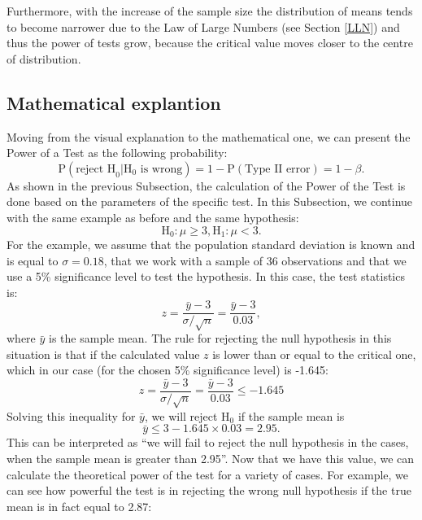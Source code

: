 \documentclass[
]{book}
\theoremstyle{definition}
\theoremstyle{definition}
\theoremstyle{definition}
\theoremstyle{definition}
\theoremstyle{remark}
\begin{document}
Furthermore, with the increase of the sample size the distribution of means tends to become narrower due to the Law of Large Numbers (see Section \ref{LLN}) and thus the power of tests grow, because the critical value moves closer to the centre of distribution.

\subsection{Mathematical explantion}\label{PowerMathematical}

Moving from the visual explanation to the mathematical one, we can present the Power of a Test as the following probability:
\begin{equation}
    \mathrm{P}(\text{reject H}_0 | \mathrm{H}_0 \text{ is wrong}) = 1 - \mathrm{P}(\text{Type II error}) = 1-\beta.
    \label{eq:powerOfATestConcept}
\end{equation}
As shown in the previous Subsection, the calculation of the Power of the Test is done based on the parameters of the specific test. In this Subsection, we continue with the same example as before and the same hypothesis:
\begin{equation*}
    \mathrm{H}_0: \mu \geq 3, \mathrm{H}_1: \mu < 3.
\end{equation*}
For the example, we assume that the population standard deviation is known and is equal to \(\sigma=0.18\), that we work with a sample of 36 observations and that we use a 5\% significance level to test the hypothesis. In this case, the test statistics is:
\begin{equation}
    z = \frac{\bar{y}-3}{\sigma/\sqrt{n}} = \frac{\bar{y}-3}{0.03} ,
    \label{eq:powerOfATest01}
\end{equation}
where \(\bar{y}\) is the sample mean. The rule for rejecting the null hypothesis in this situation is that if the calculated value \(z\) is lower than or equal to the critical one, which in our case (for the chosen 5\% significance level) is -1.645:
\begin{equation*}
    z = \frac{\bar{y}-3}{\sigma/\sqrt{n}} = \frac{\bar{y}-3}{0.03} \leq -1.645
\end{equation*}
Solving this inequality for \(\bar{y}\), we will reject H\(_0\) if the sample mean is
\begin{equation}
    \bar{y} \leq 3 -1.645 \times 0.03 = 2.95 .
    \label{eq:powerOfATest02}
\end{equation}
This can be interpreted as ``we will fail to reject the null hypothesis in the cases, when the sample mean is greater than 2.95''. Now that we have this value, we can calculate the theoretical power of the test for a variety of cases. For example, we can see how powerful the test is in rejecting the wrong null hypothesis if the true mean is in fact equal to 2.87:
\end{document}

